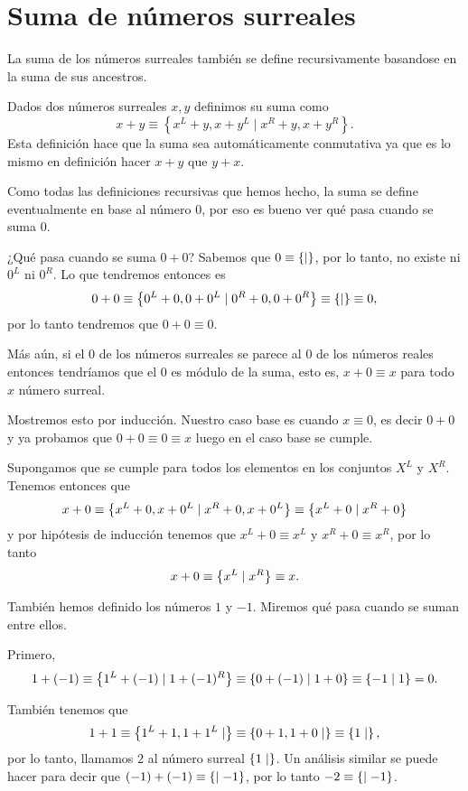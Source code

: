 \section{Suma de números surreales}

    La suma de los números surreales también se define recursivamente basandose en la suma de sus ancestros.
    
    \begin{definition}
        Dados dos n\'umeros surreales $x,y$ definimos su suma como
        \[
            x + y  \equiv \left\{x^L+y, x+y^L\;|\;x^R+y, x+y^R\right\}.
        \]
        Esta definici\'on hace que la suma sea autom\'aticamente conmutativa ya que es lo mismo en definici\'on hacer $x+y$ que $y+x$.
    \end{definition}

    Como todas las definiciones recursivas que hemos hecho, la suma se define eventualmente en base al número $0$, por eso es bueno ver qué pasa cuando se suma $0$.

    \begin{example}
        ¿Qué pasa cuando se suma $0+0$? Sabemos que $0 \equiv \left\{\mid \right\}$, por lo tanto, no existe ni $0^L$ ni $0^R$. Lo que tendremos entonces es
        \[
            0+0 \equiv \left\{0^L+0, 0+0^L\mid 0^R+0, 0+0^R\right\} \equiv \left\{\mid \right\} \equiv 0,
        \]
        por lo tanto tendremos que $0+0 \equiv 0$.
    \end{example}

    \begin{example}
        Más aún, si el $0$ de los números surreales se parece al $0$ de los números reales entonces tendríamos que el $0$ es módulo de la suma, esto es, $x+0 \equiv x$ para todo $x$ n\'umero surreal.

        Mostremos esto por inducci\'on. Nuestro caso base es cuando $x \equiv 0$, es decir $0+0$ y ya probamos que $0+0\equiv 0\equiv x$ luego en el caso base se cumple.

        Supongamos que se cumple para todos los elementos en los conjuntos $X^L$ y $X^R$. Tenemos entonces que
        \[
            x + 0 \equiv \left\{x^L+0, x+0^L\mid x^R+0, x+0^L\right\} \equiv \left\{x^L+0\mid x^R+0\right\}
        \]
        y por hip\'otesis de inducci\'on tenemos que $x^L+0 \equiv x^L$ y $x^R+0 \equiv x^R$, por lo tanto 
        \[
            x + 0 \equiv \left\{x^L\mid x^R\right\} \equiv x.
        \]
    \end{example}

    \begin{example}
        Tambi\'en hemos definido los n\'umeros $1$ y $-1$. Miremos qu\'e pasa cuando se suman entre ellos.

        Primero,
        \[
            1 + (-1) \equiv \left\{1^L + (-1)\mid 1+(-1)^R\right\} \equiv \left\{0+(-1)\mid 1+0\right\} \equiv \left\{-1\mid 1\right\} = 0.
        \]

        Tambi\'en tenemos que
        \[
            1 + 1 \equiv \left\{1^L+1, 1+1^L\mid \right\} \equiv \left\{0+1,1+0\mid \right\} \equiv \left\{1\mid \right\},
        \]
        por lo tanto, llamamos $2$ al n\'umero surreal $\left\{1\mid \right\}$. Un an\'alisis similar se puede hacer para decir que $(-1)+(-1) \equiv \left\{\mid -1\right\}$, por lo tanto $-2 \equiv \left\{\mid -1\right\}$.
    \end{example}

